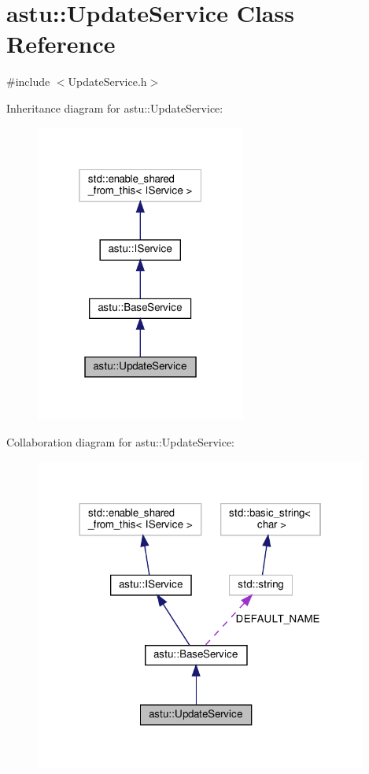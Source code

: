 \hypertarget{classastu_1_1UpdateService}{}\section{astu\+:\+:Update\+Service Class Reference}
\label{classastu_1_1UpdateService}


{\ttfamily \#include $<$Update\+Service.\+h$>$}



Inheritance diagram for astu\+:\+:Update\+Service\+:\nopagebreak
\begin{figure}[H]
\begin{center}
\leavevmode
\includegraphics[width=196pt]{classastu_1_1UpdateService__inherit__graph}
\end{center}
\end{figure}


Collaboration diagram for astu\+:\+:Update\+Service\+:\nopagebreak
\begin{figure}[H]
\begin{center}
\leavevmode
\includegraphics[width=310pt]{classastu_1_1UpdateService__coll__graph}
\end{center}
\end{figure}
